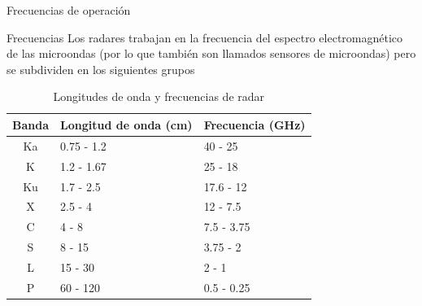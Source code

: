 \begin{frame}{Frecuencias de operación}
  \begin{block}{Frecuencias}
    Los radares trabajan en la frecuencia del espectro electromagnético de las microondas (por lo que también son llamados sensores de microondas) pero se subdividen en los siguientes grupos
  \end{block}

  \footnotesize
  \begin{table}
    \caption{Longitudes de onda y frecuencias de radar}
    \label{tab:longitudes_onda}
    \begin{center}
      \begin{tabular}[c]{c|l|l}
        \hline
        Banda & Longitud de onda (cm) & Frecuencia (GHz) \\
        \hline
        Ka & 0.75 - 1.2 & 40 - 25 \\
        K & 1.2 - 1.67 & 25 - 18 \\
        Ku & 1.7 - 2.5 & 17.6 - 12 \\
        X & 2.5 - 4 & 12 - 7.5 \\
        C & 4 - 8 & 7.5 - 3.75 \\
        S & 8 - 15 & 3.75 - 2 \\
        L & 15 - 30 & 2 - 1 \\
        P & 60 - 120 & 0.5 - 0.25 \\
        \hline
      \end{tabular}
    \end{center}
  \end{table}
\end{frame}

